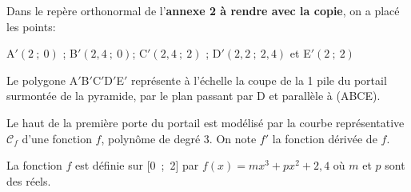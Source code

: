 \documentclass[10pt]{article}
\begin{document}
\medskip 

Dans le repère orthonormal de l'\textbf{annexe 2 à rendre avec la copie}, on a placé les points: 

A$'(2~;~0)$ ; B$'(2,4~;~0)$; C$'(2,4~;~2)$ ; D$'(2,2~;~2,4)$ et E$'(2~;~2)$ 

Le polygone A$'$B$'$C$'$D$'$E$'$ représente à l'échelle la coupe de la 1 pile du portail surmontée de la pyramide, par le plan passant par D et parallèle à (ABCE). 

Le haut de la première porte du portail est modélisé par la courbe représentative $\mathcal{C}_f$ d'une fonction $f$, polynôme de degré 3. On note $f'$ la fonction dérivée de $f$. 

La fonction $f$ est définie sur [0~;~2] par $f(x) = mx^3 + px^2 + 2,4$ où $m$ et $p$ sont des réels.

\medskip 
\end{document}
